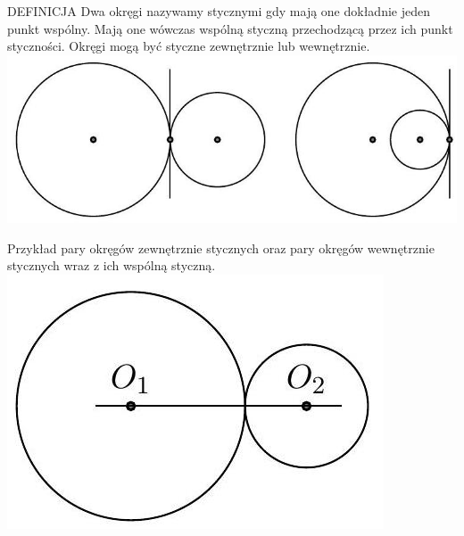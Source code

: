 \documentclass[10pt]{article}
\begin{document}
DEFINICJA Dwa okręgi nazywamy stycznymi gdy mają one dokładnie jeden punkt wspólny. Mają one wówczas wspólną styczną przechodzącą przez ich punkt styczności. Okręgi mogą być styczne zewnętrznie lub wewnętrznie.\\
\includegraphics[max width=\textwidth, center]{2024_11_21_e9b4faa005d5be2cc318g-035(1)}

Przykład pary okręgów zewnętrznie stycznych oraz pary okręgów wewnętrznie stycznych wraz z ich wspólną styczną.\\
\includegraphics[max width=\textwidth, center]{2024_11_21_e9b4faa005d5be2cc318g-035(2)}
\end{document}
